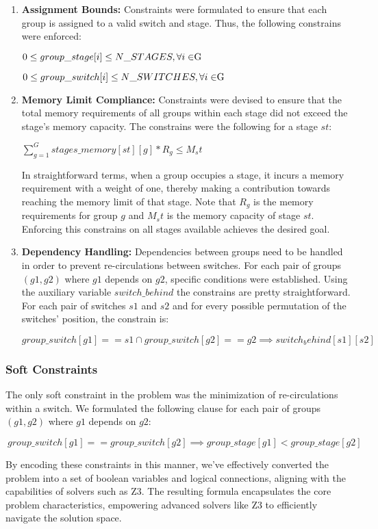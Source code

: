 \begin{enumerate}
    \item \textbf{Assignment Bounds:} Constraints were formulated to ensure that each group is assigned to a valid switch and stage. Thus, the following constrains were enforced:
    \begin{center}
        \(0 \leq group\_stage[i] \le N\_STAGES, \forall i \in $G$ \)
        
        \(0 \leq group\_switch[i] \le N\_SWITCHES, \forall i \in $G$ \)
    \end{center}

    \item \textbf{Memory Limit Compliance:} Constraints were devised to ensure that the total memory requirements of all groups within each stage did not exceed the stage's memory capacity. The constrains were the following for a stage $st$:
    \begin{center}
        \(\sum_{g=1}^{G} stages\_memory[st][g] * R_g \leq M_st \)
    \end{center}
    In straightforward terms, when a group occupies a stage, it incurs a memory requirement with a weight of one, thereby making a contribution towards reaching the memory limit of that stage. Note that $R_g$ is the memory requirements for group $g$ and $M_st$ is the memory capacity of stage $st$. Enforcing this constrains on all stages available achieves the desired goal.

    \item \textbf{Dependency Handling:} Dependencies between groups need to be handled in order to prevent re-circulations between switches. For each pair of groups \((g1, g2)\) where \(g1\) depends on \(g2\), specific conditions were established. Using the auxiliary variable $switch\_behind$ the constrains are pretty straightforward. For each pair of switches $s1$ and $s2$ and for every possible permutation of the switches' position, the constrain is:
    \begin{center}
        \(group\_switch[g1] == s1 \cap group\_switch[g2] == g2 \implies switch_behind[s1][s2]  \)
        
    \end{center}
\end{enumerate}

\subsubsection{Soft Constraints}    

The only soft constraint in the problem was the minimization of re-circulations within a switch. We formulated the following clause for each pair of groups \((g1, g2)\) where \(g1\) depends on \(g2\):
\begin{center}
    \(\ group\_switch[g1] == group\_switch[g2] \implies group\_stage[g1] < group\_stage[g2]  \)
\end{center}

By encoding these constraints in this manner, we've effectively converted the problem into a set of boolean variables and logical connections, aligning with the capabilities of solvers such as Z3. The resulting formula encapsulates the core problem characteristics, empowering advanced solvers like Z3 to efficiently navigate the solution space.